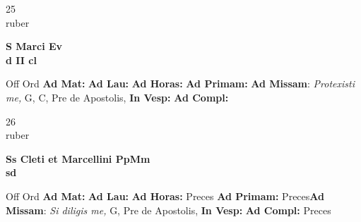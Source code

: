 \documentclass[10pt, openany]{book}
\begin{document}
    \begin{center}
        \begin{minipage}{3.5in}
            \vspace{2em}
            \begin{minipage}{0.5in}
                {\Huge 25} \\
                {\normalsize ruber}
            \end{minipage}
            \begin{minipage}{3.0in}
                \textbf{ \large S Marci Ev \\
                \textnormal{\normalsize d II cl}}

            \end{minipage}
            \begin{justify}Off Ord
                \textbf{Ad Mat: }
                \textbf{Ad Lau: }
                \textbf{Ad Horas: }
                \textbf{Ad Primam: }\textbf{Ad Missam}: \textit{Protexisti me,} G, C, Pre de Apostolis, 
                \textbf{In Vesp: }
                \textbf{Ad Compl: }
            \end{justify}
        \end{minipage}
    \end{center}

    \begin{center}
        \begin{minipage}{3.5in}
            \vspace{2em}
            \begin{minipage}{0.5in}
                {\Huge 26} \\
                {\normalsize ruber}
            \end{minipage}
            \begin{minipage}{3.0in}
                \textbf{ \large Ss Cleti et Marcellini PpMm \\
                \textnormal{\normalsize sd}}

            \end{minipage}
            \begin{justify}Off Ord
                \textbf{Ad Mat: }
                \textbf{Ad Lau: }
                \textbf{Ad Horas: }Preces
                \textbf{Ad Primam: }Preces\textbf{Ad Missam}: \textit{Si diligis me,} G, Pre de Apostolis, 
                \textbf{In Vesp: }
                \textbf{Ad Compl: }Preces
            \end{justify}
        \end{minipage}
    \end{center}
\end{document}
